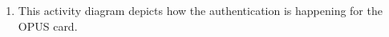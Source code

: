 \documentclass[a4paper,12pt]{article}
\begin{document}
\begin{enumerate}
\item This activity diagram depicts how the authentication is happening for the OPUS card.
\begin{center}
\end{center}


\end{enumerate}
\end{document}
